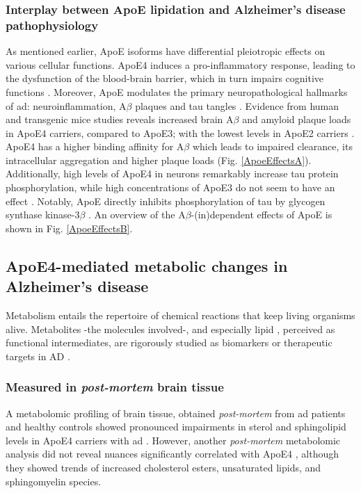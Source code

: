 \documentclass{amsart}
\begin{document}
\subsubsection{Interplay between ApoE lipidation and Alzheimer's disease pathophysiology}\label{ApoEAD}
As mentioned earlier, ApoE isoforms have differential pleiotropic effects on various cellular functions. ApoE4 induces a pro-inflammatory response, leading to the dysfunction of the blood-brain barrier, which in turn impairs cognitive functions \cite{Marottoli2017PeripheralDysfunction, Teng2017ApoEInjury, Kloske2020TheDisease}. Moreover, ApoE modulates the primary neuropathological hallmarks of \acrshort{ad}: neuroinflammation, A$\beta$ plaques and tau tangles \cite{Husain2021APOETherapeutics}. Evidence from human and transgenic mice studies reveals increased brain A$\beta$ and amyloid plaque loads in ApoE4 carriers, compared to ApoE3; with the lowest levels in ApoE2 carriers \cite{Huang2017ApoE2Secretion, Tachibana2016RescuingLRP1, Safieh2019ApoE4:Disease}. ApoE4 has a higher binding affinity for A$\beta$ which leads to impaired clearance, its intracellular aggregation and higher plaque loads \cite{Kloske2020TheDisease} (Fig. \ref{ApoeEffectsA}). Additionally, high levels of ApoE4 in neurons remarkably increase tau protein phosphorylation, while high concentrations of ApoE3 do not seem to have an effect \cite{Cao2017ApoE4-associatedInjury, Shi2017ApoE4Tauopathy, Vasilevskaya2020InteractionAthletes, Wang2018GainCorrector}. Notably,  ApoE directly inhibits phosphorylation of tau by glycogen synthase kinase-3$\beta$ \cite{Hoe2006ApolipoproteinNeurons}. An overview of the A$\beta$-(in)dependent effects of ApoE is shown in Fig. \ref{ApoeEffectsB}.

\subsection{ApoE4-mediated metabolic changes in Alzheimer's disease}
Metabolism entails the repertoire of chemical reactions that keep living organisms alive. Metabolites -the molecules involved-, and especially lipid \cite{Barupal2019SetsPathophysiology,Fernandez-Calle2022APOEDiseases, Proitsi2017AssociationAnalysis}, perceived as functional intermediates, are rigorously studied as biomarkers or therapeutic targets in AD \cite{Oeckl2019GlialImpairment}.
 
\subsubsection{Measured in \textit{post-mortem} brain tissue} A metabolomic profiling of brain tissue, obtained \textit{post-mortem} from \acrshort{ad} patients and healthy controls showed  pronounced impairments in sterol and sphingolipid levels in ApoE4 carriers with \acrshort{ad}  \cite{Bandaru2009ApoE4Brain}. However, another \textit{post-mortem} metabolomic analysis did not reveal nuances significantly correlated with ApoE4 \cite{Novotny2023MetabolomicBrains}, although they showed trends of increased cholesterol esters, unsaturated lipids, and sphingomyelin species.
\end{document}
